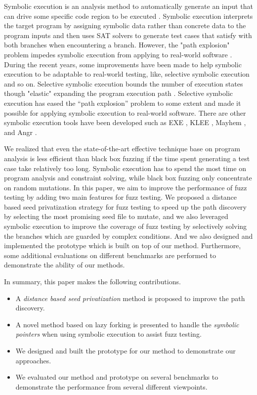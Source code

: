 Symbolic execution is an analysis method to automatically generate an input that can drive some specific code region to be executed \cite{King:Symbex}. Symbolic execution interprets the target program by assigning symbolic data rather than concrete data to the program inputs and then uses SAT solvers to generate test cases that satisfy with both branches when encountering a branch. However, the "path explosion" problem impedes symbolic execution from applying to real-world software \cite{Boonstoppel:RAP}. During the recent years, some improvements have been made to help symbolic execution to be adaptable to real-world testing, like, selective symbolic execution and so on. Selective symbolic execution bounds the number of execution states though "elastic" expanding the program execution path \cite{chipounov2009selective, chipounov2011s2e}. Selective symbolic execution has eased the ``path explosion'' problem to some extent and made it possible for applying symbolic execution to real-world software. There are other symbolic execution tools have been developed such as EXE \cite{cadar2006exe}, KLEE \cite{cadar2008klee}, Mayhem \cite{cha2012unleashing}, and Angr \cite{shoshitaishvili2016sok}. 

We realized that even the state-of-the-art effective technique base on program analysis is less efficient than black box fuzzing if the time spent generating a test case take relatively too long. Symbolic execution has to spend the most time on program analysis and constraint solving, while black box fuzzing only concentrate on random mutations. 
In this paper, we aim to improve the performance of fuzz testing by adding two main features for fuzz testing. We proposed a distance based seed privatization strategy for fuzz testing to speed up the path discovery by selecting the most promising seed file to mutate, and we also leveraged symbolic execution to improve the coverage of fuzz testing by selectively solving the branches which are guarded by complex conditions. And we also designed and implemented the prototype which is built on top of our method. Furthermore, some additional evaluations on different benchmarks are performed to demonstrate the ability of our methods.
 
In summary, this paper makes the following contributions.
\begin{itemize}
\item A \emph{distance based seed privatization} method is proposed to improve the path discovery.

\item A novel method based on lazy forking is presented to handle the \emph{symbolic pointers} when using symbolic execution to assist fuzz testing.

\item We designed and built the prototype for our method to demonstrate our approaches.

\item We evaluated our method and prototype on several benchmarks to demonstrate the performance from several different viewpoints.
\end{itemize}
